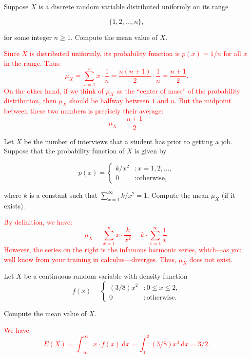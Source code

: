 \documentclass[12pt,reqno]{amsart}
\begin{document}
\bigskip
\prob Suppose $X$ is a discrete random variable distributed uniformly on its range
    
	\[
	\{1,2,\ldots,n\},
	\]

for some integer $n\geq 1$. Compute the mean value of $X$.

\bigskip
\textcolor{red}{Since $X$ is distributed uniformly, its probability function is $p(x) = 1/n$ for all $x$ in the range. Thus:
	\[
	\mu_X = \sum_{x=1}^n x\cdot \frac{1}{n} = \frac{n(n+1)}{2} \cdot \frac{1}{n} = \frac{n+1}{2}.
	\]
On the other hand, if we think of $\mu_X$ as the ``center of mass'' of the probability distribution, then $\mu_X$ should be halfway between $1$ and $n$. But the midpoint between these two numbers is precisely their average:
	\[
	\mu_X = \frac{n+1}{2}.
	\]}


\bigskip
\prob Let $X$ be the number of interviews that a student has prior to getting a job. Suppose that the probability function of $X$ is given by

	\[
	p(x) = \begin{cases}
	k/x^2 & : x=1,2,\ldots, \\
	0 & : \text{otherwise,}
	\end{cases}
	\]

where $k$ is a constant such that $\sum_{x=1}^\infty k/x^2 = 1$. Compute the mean $\mu_X$ (if it exists).

\bigskip
\textcolor{red}{By definition, we have:
	\[
	\mu_X = \sum_{x=1}^\infty x\cdot  \frac{k}{x^2} = k\cdot \sum_{x=1}^\infty \frac{1}{x}.
	\]
However, the series on the right is the infamous harmonic series, which---as you well know from your training in calculus---diverges. Thus, $\mu_X$ does not exist.}

















\bigskip
\prob Let $X$ be a continuous random variable with density function
	\[
	f(x) = \begin{cases}
	(3/8)x^2 & : 0 \leq x \leq 2, \\
	0 & : \text{otherwise}.
	\end{cases}
	\]

Compute the mean value of $X$.

\bigskip
\textcolor{red}{We have
	\[
	E(X) = \int_{-\infty}^\infty x \cdot f(x) \ \text{d}x = \int_0^2 (3/8)x^3 \ \text{d} x = 3/2.
	\]}
\end{document}
